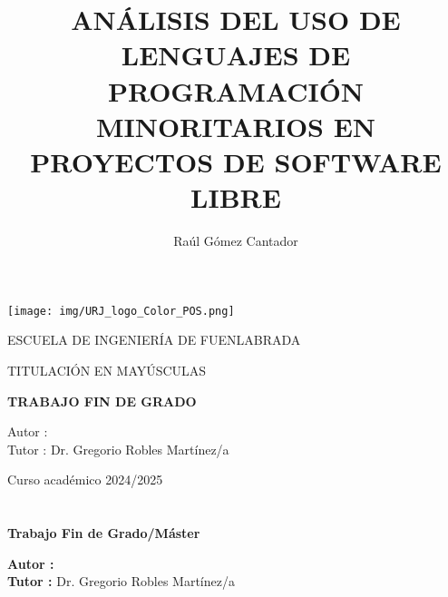 \documentclass[a4paper, 12pt]{book}
\title{ANÁLISIS DEL USO DE LENGUAJES DE PROGRAMACIÓN MINORITARIOS EN PROYECTOS DE SOFTWARE LIBRE}
\author{Raúl Gómez Cantador}
\makeatletter
\let\thetitle\@title
\let\theauthor\@author
\makeatother
\begin{document}
\renewcommand{\refname}{Bibliografía}  %
\renewcommand{\appendixname}{Apéndice}



\begin{titlepage}
  \begin{center}
    \texttt{[image: img/URJ\_logo\_Color\_POS.png]}

    \vspace{1.75cm}

    \LARGE
    ESCUELA DE INGENIERÍA DE FUENLABRADA
    \vspace{1cm}

    \LARGE
    TITULACIÓN EN MAYÚSCULAS

    \vspace{1cm}
    \LARGE
    \textbf{TRABAJO FIN DE GRADO}

    \vspace{2cm}

    \Large
    \MakeUppercase{\thetitle}

    \vspace{2cm}

    \large
    Autor : \theauthor \\
    Tutor : Dr. Gregorio Robles Martínez/a\\
    \vspace{1cm}

    \large
    Curso académico 2024/2025

  \end{center}
\end{titlepage}

\newpage
\mbox{}
\thispagestyle{empty} %



\clearpage
{}
\chapter*{}

\vspace{-4cm}
\begin{center}
  \LARGE
  \textbf{Trabajo Fin de Grado/Máster}

  \vspace{1cm}
  \large
  \thetitle

  \vspace{0.8cm}
  \large
  \textbf{Autor :} \theauthor \\
  \textbf{Tutor :} Dr. Gregorio Robles Martínez/a

\end{center}
\end{document}
